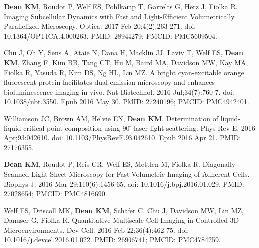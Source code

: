 \begin{etaremune}
\item \textbf{Dean KM}, Roudot P, Welf ES, Pohlkamp T, Garrelts G, Herz J, Fiolka R. Imaging Subcellular Dynamics with Fast and Light-Efficient Volumetrically Parallelized Microscopy. Optica. 2017 Feb 20;4(2):263-271. doi: 10.1364/OPTICA.4.000263. PMID: 28944279; PMCID: PMC5609504.

\item Chu J, Oh Y, Sens A, Ataie N, Dana H, Macklin JJ, Laviv T, Welf ES, \textbf{Dean KM}, Zhang F, Kim BB, Tang CT, Hu M, Baird MA, Davidson MW, Kay MA, Fiolka R, Yasuda R, Kim DS, Ng HL, Lin MZ. A bright cyan-excitable orange fluorescent protein facilitates dual-emission microscopy and enhances bioluminescence imaging in vivo. Nat Biotechnol. 2016 Jul;34(7):760-7. doi: 10.1038/nbt.3550. Epub 2016 May 30. PMID: 27240196; PMCID: PMC4942401.

\item Williamson JC, Brown AM, Helvie EN, \textbf{Dean KM}. Determination of liquid-liquid critical point composition using 90$^\circ$ laser light scattering. Phys Rev E. 2016 Apr;93:042610. doi: 10.1103/PhysRevE.93.042610. Epub 2016 Apr 21. PMID: 27176355.

\item \textbf{Dean KM}, Roudot P, Reis CR, Welf ES, Mettlen M, Fiolka R. Diagonally Scanned Light-Sheet Microscopy for Fast Volumetric Imaging of Adherent Cells. Biophys J. 2016 Mar 29;110(6):1456-65. doi: 10.1016/j.bpj.2016.01.029. PMID: 27028654; PMCID: PMC4816690.

\item Welf ES, Driscoll MK, \textbf{Dean KM}, Schäfer C, Chu J, Davidson MW, Lin MZ, Danuser G, Fiolka R. Quantitative Multiscale Cell Imaging in Controlled 3D Microenvironments. Dev Cell. 2016 Feb 22;36(4):462-75. doi: 10.1016/j.devcel.2016.01.022. PMID: 26906741; PMCID: PMC4784259.


\end{etaremune}
